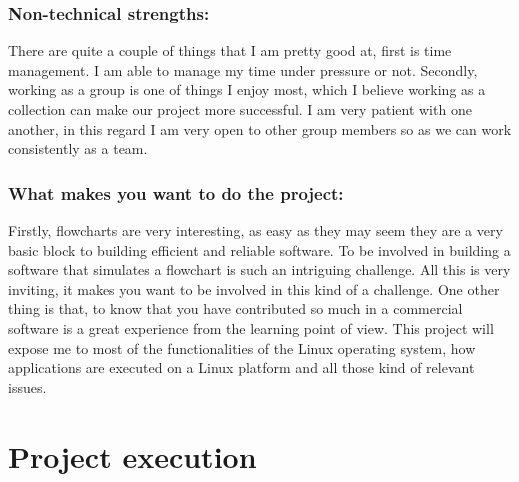 \documentclass[12pt]{article}
\begin{document}
\begin{description}
	\subsubsection{Non-technical strengths:}
	
	There are quite a couple of things that I am pretty good at, first is time management. I am able to manage my time under pressure or not. Secondly, working as a group is one of things I enjoy most, which I believe working as a collection can make our project more successful. I am very patient with one another, in this regard I am very open to other group members so as we can work consistently as a team.
	
	\subsubsection{What makes you want to do the project:}
	
	Firstly, flowcharts are very interesting, as easy as they may seem they are a very basic block to building efficient and reliable software. To be involved in building a software that simulates a flowchart is such an intriguing challenge. All this is very inviting, it makes you want to be involved in this kind of a challenge. One other thing is that, to know that you have contributed so much in a commercial software is a great experience from the learning point of view. This project will expose me to most of the functionalities of the Linux operating system, how applications are executed on a Linux platform and all those kind of relevant issues.


\end{description}

\section{Project execution}
\end{document}
